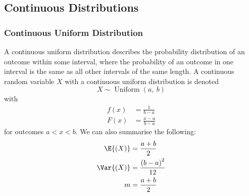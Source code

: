 \documentclass{article}
\begin{document}
\subsection{Continuous Distributions}
\subsubsection{Continuous Uniform Distribution}
A continuous uniform distribution describes the probability
distribution of an outcome within some interval, where the probability
of an outcome in one interval is the same as all other intervals of the
same length. A continuous random variable \(X\) with a continuous
uniform distribution is denoted
\begin{equation*}
    X \sim \operatorname{Uniform}{\left( a,\: b \right)}
\end{equation*}
with
\begin{align*}
    f\left( x \right) & = \frac{1}{b - a}     \\
    F\left( x \right) & = \frac{x - a}{b - a}
\end{align*}
for outcomes \(a < x < b\).
We can also summarise the following:
\begin{align*}
    \E{\left( X \right)}   & = \frac{a + b}{2}                   \\
    \Var{\left( X \right)} & = \frac{\left( b - a \right)^2}{12} \\
    m                      & = \frac{a + b}{2}
\end{align*}
\end{document}
